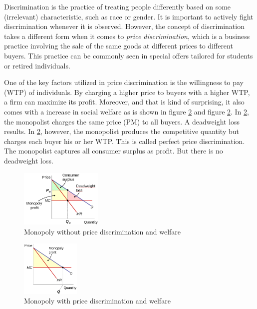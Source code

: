 \documentclass[
  12pt,
  oneside]{book}
\theoremstyle{definition}
\theoremstyle{definition}
\theoremstyle{definition}
\theoremstyle{definition}
\theoremstyle{remark}
\begin{document}
Discrimination is the practice of treating people differently based on some (irrelevant) characteristic, such as race or gender. It is important to actively fight discrimination whenever it is observed. However, the concept of discrimination takes a different form when it comes to \emph{price discrimination}, which is a business practice involving the sale of the same goods at different prices to different buyers. This practice can be commonly seen in special offers tailored for students or retired individuals.

One of the key factors utilized in price discrimination is the willingness to pay (WTP) of individuals. By charging a higher price to buyers with a higher WTP, a firm can maximize its profit. Moreover, and that is kind of surprising, it also comes with a increase in social welfare as is shown in figure \ref{fig:monowpd} and figure \ref{fig:monowpd}. In \ref{fig:monowpd}, the monopolist charges the same price (PM) to all buyers. A deadweight loss results. In \ref{fig:monowpd}, however, the monopolist produces the competitive quantity but charges each buyer his or her WTP. This is called perfect price discrimination. The monopolist captures all consumer surplus as profit. But there is no deadweight loss.

\begin{figure}
\centering
\includegraphics[width=0.35\textwidth,height=\textheight]{fig/discrimination.png}
\caption{\label{fig:monowoutpd} Monopoly without price discrimination and welfare}
\end{figure}

\begin{figure}
\centering
\includegraphics[width=0.25\textwidth,height=\textheight]{fig/discrimination2.png}
\caption{\label{fig:monowpd} Monopoly with price discrimination and welfare}
\end{figure}
\end{document}
